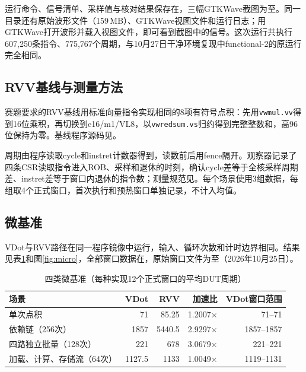 运行命令、信号清单、采样值与核对结果保存在，三幅GTKWave截图为至。同一目录还有原始波形文件（159\,MB）、GTKWave视图文件和运行日志；用GTKWave打开波形并载入视图文件，即可看到截图中的信号。这次运行共执行607,250条指令、775,767个周期，与10月27日干净环境复现中functional-2的原运行完全相同。

\subsection{RVV基线与测量方法}

赛题要求的RVV基线用标准向量指令实现相同的8项有符号点积：先用\texttt{vwmul.vv}得到16位乘积，再切换到e16/m1/VL8，以\texttt{vwredsum.vs}归约得到完整整数和，高96位保持为零。基线程序源码见。

周期由程序读取cycle和instret计数器得到，读数前后用fence隔开。观察器记录了四条CSR读取指令进入ROB、采样和退休的时刻，确认cycle差等于全核采样周期差、instret差等于窗口内退休的指令数；测量规范见。每个场景使用3组数据，每组取4个正式窗口，首次执行和预热窗口单独记录，不计入均值。

\subsection{微基准}\label{sec:s3-micro}

VDot与RVV路径在同一程序镜像中运行，输入、循环次数和计时边界相同。结果见表\ref{tab:micro}和图\ref{fig:micro}，全部窗口数据在，原始窗口文件为至（2026年10月25日）。

\begin{table}[!htbp]\centering\small
\caption{四类微基准（每种实现12个正式窗口的平均DUT周期）}\label{tab:micro}
\begin{tabular}{lrrrr}
\toprule
场景 & VDot & RVV & 加速比 & VDot窗口范围\\
\midrule
单次点积 & 71 & 85.25 & 1.2007$\times$ & 71--71\\
依赖链（256次） & 1857 & 5440.5 & 2.9297$\times$ & 1857--1857\\
四路独立批量（128次） & 221 & 678 & 3.0679$\times$ & 221--221\\
加载、计算、存储流（64次） & 1127.5 & 1133 & 1.0049$\times$ & 1119--1131\\
\bottomrule
\end{tabular}
\end{table}

